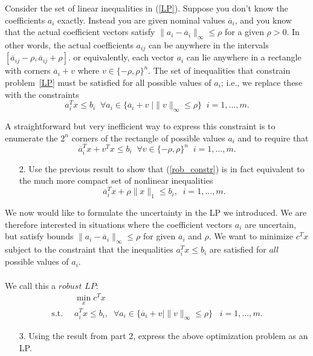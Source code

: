 \documentclass[11pt]{article}
\begin{document}
Consider the set of linear inequalities in (\ref{LP}). Suppose you don't know the coefficients $a_i$ exactly. Instead you are given nominal values $\overline{a}_i$, and you know that the actual coefficient vectors satisfy $\|a_i - \overline{a}_i\|_{\infty} \leq \rho $ for a given $\rho > 0$. In other words, the actual coefficients $a_{ij}$ can be anywhere in the intervals $[\overline{a}_{ij} - \rho, \overline{a}_{ij} + \rho]$.  or equivalently, each vector $a_i$ can lie anywhere in a rectangle with corners $\overline{a}_i + v$ where $v \in \{-\rho, \rho\}^n$. The set of inequalities that constrain problem~\ref{LP} must be satisfied for all possible values of $a_i$; i.e., we replace these with the constraints
    \begin{equation}
    \label{rob_constr}
           a_i^Tx \leq b_i \; \; \forall a_i \in \{\overline{a}_i + v \; \mid \|v\|_{\infty} \leq \rho \} \; \;  i = 1, ..., m.
    \end{equation}

    A straightforward but very inefficient way to express this constraint is to enumerate the $2^n$ corners of the rectangle of possible values $a_i$ and to require that
    \[
    \overline{a}_i^Tx + v^Tx \leq b_i \; \; \forall v \in \{-\rho, \rho\}^n \; \; i = 1, ..., m.
    \]

    \begin{enumerate}
    \item[2.]
    Use the previous result to show that (\ref{rob_constr}) is in fact equivalent to the much more compact set of nonlinear inequalities
    \[
        \overline{a}_i^Tx + \rho\|x\|_1 \leq b_i, \; \; i = 1,...,m.
    \]

    \end{enumerate}

    We now would like to formulate the uncertainty in the LP we introduced. We are therefore interested in situations where the coefficient vectors $a_i$ are uncertain, but satisfy bounds $\|a_i - \overline{a}_i\|_{\infty} \leq \rho$  for given $\overline{a}_i$ and $\rho$. We want to minimize $c^Tx$ subject to the constraint that the inequalities $a_i^Tx \leq b_i$ are satisfied for $\textit{all}$ possible values of $a_i$. \\ \\
    We call this a $\textit{robust LP}:$
    \begin{align}
    &\min_x c^Tx \nonumber \\
    \label{RLP}
    \text{s.t.} \; \;  &a_i^Tx \leq b_i, \; \; \forall a_i \in \{ \overline{a}_i + v \mid \|v\|_{\infty} \leq \rho \} \; \; \; i = 1,...,m.
\end{align}

\begin{enumerate}
    \item[3.] Using the result from part 2, express the above optimization problem as an LP.

\end{enumerate}

\begin{solution}
\end{solution}
\end{document}
